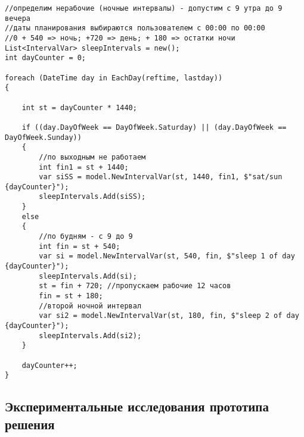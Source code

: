 \begin{verbatim}
//определим нерабочие (ночные интервалы) - допустим с 9 утра до 9 вечера
//даты планирования выбираются пользователем с 00:00 по 00:00
//0 + 540 => ночь; +720 => день; + 180 => остатки ночи
List<IntervalVar> sleepIntervals = new();
int dayCounter = 0;

foreach (DateTime day in EachDay(reftime, lastday))
{
    
    int st = dayCounter * 1440;
    
    if ((day.DayOfWeek == DayOfWeek.Saturday) || (day.DayOfWeek == DayOfWeek.Sunday))
    {
        //по выходным не работаем
        int fin1 = st + 1440;
        var siSS = model.NewIntervalVar(st, 1440, fin1, $"sat/sun {dayCounter}");
        sleepIntervals.Add(siSS);
    }
    else
    {
        //по будням - с 9 до 9
        int fin = st + 540;
        var si = model.NewIntervalVar(st, 540, fin, $"sleep 1 of day {dayCounter}");
        sleepIntervals.Add(si);
        st = fin + 720; //пропускаем рабочие 12 часов
        fin = st + 180;
        //второй ночной интервал
        var si2 = model.NewIntervalVar(st, 180, fin, $"sleep 2 of day {dayCounter}");
        sleepIntervals.Add(si2);
    }
    
    dayCounter++;
}
\end{verbatim}

\subsection{Экспериментальные исследования прототипа решения}

\clearpage
